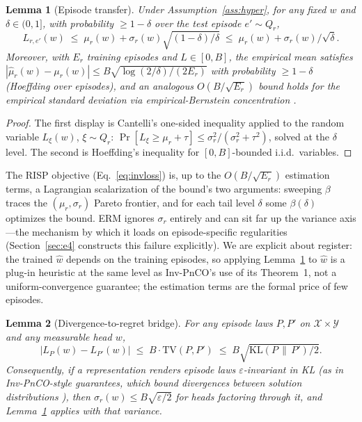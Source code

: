 \documentclass{article}
\newtheorem{lemma}{Lemma}
\newcommand{\TV}{\mathrm{TV}}
\newcommand{\KL}{\mathrm{KL}}
\newcommand{\nm}{\textsc{RISP}}
\begin{document}
\begin{lemma}[Episode transfer]
\label{lem:transfer}
Under Assumption~\ref{ass:hyper}, for any fixed $w$ and $\delta \in (0,1]$,
with probability $\ge 1 - \delta$ over the test episode $e' \sim Q_r$,
\[
  L_{r, e'}(w) \;\le\; \mu_r(w) + \sigma_r(w)\sqrt{(1-\delta)/\delta}
  \;\le\; \mu_r(w) + \sigma_r(w)/\sqrt{\delta}.
\]
Moreover, with $E_r$ training episodes and $L \in [0, B]$, the empirical
mean satisfies $|\hat\mu_r(w) - \mu_r(w)| \le B \sqrt{\log(2/\delta) /
(2 E_r)}$ with probability $\ge 1 - \delta$ (Hoeffding over episodes), and
an analogous $O(B/\sqrt{E_r})$ bound holds for the empirical standard
deviation via empirical-Bernstein concentration
\citep{maurer2009empirical}.
\end{lemma}

\begin{proof}
The first display is Cantelli's one-sided inequality applied to the random
variable $L_\xi(w)$, $\xi \sim Q_r$: $\Pr[L_\xi \ge \mu_r + \tau] \le
\sigma_r^2 / (\sigma_r^2 + \tau^2)$, solved at the $\delta$ level. The
second is Hoeffding's inequality for $[0, B]$-bounded i.i.d.\ variables.
\end{proof}

The \nm{} objective (Eq.~\ref{eq:invloss}) is, up to the $O(B/\sqrt{E_r})$
estimation terms, a Lagrangian scalarization of the bound's two arguments:
sweeping $\beta$ traces the $(\mu_r, \sigma_r)$ Pareto frontier, and for
each tail level $\delta$ some $\beta(\delta)$ optimizes the bound. ERM
ignores $\sigma_r$ entirely and can sit far up the variance axis---the
mechanism by which it loads on episode-specific regularities
(Section~\ref{sec:e4} constructs this failure explicitly). We are explicit
about register: the trained $\hat w$ depends on the training episodes, so
applying Lemma~\ref{lem:transfer} to $\hat w$ is a plug-in heuristic at the
same level as Inv-PnCO's use of its Theorem~1, not a uniform-convergence
guarantee; the estimation terms are the formal price of few episodes.

\begin{lemma}[Divergence-to-regret bridge]
\label{lem:bridge}
For any episode laws $P, P'$ on $\mathcal{X} \times \mathcal{Y}$ and any
measurable head $w$,
\[
  |L_P(w) - L_{P'}(w)| \;\le\; B \cdot \TV(P, P')
  \;\le\; B \sqrt{\KL(P \,\|\, P') / 2}.
\]
Consequently, if a representation renders episode laws
$\varepsilon$-invariant in KL (as in Inv-PnCO-style guarantees, which bound
divergences between solution distributions \citep{yan2026invpnco}), then
$\sigma_r(w) \le B\sqrt{\varepsilon / 2}$ for heads factoring through it,
and Lemma~\ref{lem:transfer} applies with that variance.
\end{lemma}
\end{document}
